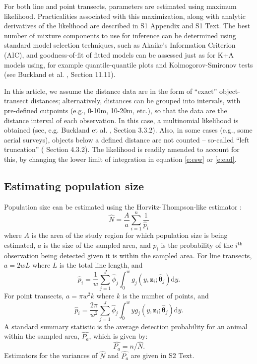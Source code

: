 \documentclass[10pt]{article}
\begin{document}
For both line and point transects, parameters are estimated using maximum likelihood. Practicalities associated with this maximization, along with analytic derivatives of the likelihood are described in S1 Appendix and S1 Text.  The best number of mixture components to use for inference can be determined using standard model selection techniques, such as Akaike's Information Criterion (AIC), and goodness-of-fit of fitted models can be assessed just as for K+A models using, for example quantile-quantile plots and Kolmogorov-Smironov tests (see Buckland et al. \cite{Buckland:2004ts}, Section 11.11).

In this article, we assume the distance data are in the form of ``exact'' object-transect distances; alternatively, distances can be grouped into intervals, with pre-defined cutpoints (e.g., 0-10m, 10-20m, etc.), so that the data are the distance interval of each observation.  In this case, a multinomial likelihood is obtained (see, e.g. Buckland et al. \cite{Buckland:2001vm}, Section 3.3.2).  Also, in some cases (e.g., some aerial surveys), objects below a defined distance are not counted -- so-called ``left truncation'' (\cite{Buckland:2001vm} Section 4.3.2).  The likelihood is readily amended to account for this, by changing the lower limit of integration in equation \eqref{e:esw} or \eqref{e:ead}.

\subsection*{Estimating population size}

Population size can be estimated using the Horvitz-Thompson-like estimator \cite{Marques:2003vb}:
\begin{equation}
\label{e:popsize}
\hat{N}=\frac{A}{a}\sum_{i=1}^n \frac{1}{\hat {p}_i}
\end{equation}
where $A$ is the area of the study region for which population size is being estimated, $a$ is the size of the sampled area, and $p_i$ is the probability of the $i^\text{th}$ observation being detected given it is within the sampled area.  For line transects, $a=2wL$ where $L$ is the total line length, and 
\begin{equation*}
\hat{p}_i = \frac{1}{w} \sum_{j=1}^J \hat{\phi}_j \int_0^w  g_j(y,\mathbf{z}_{i}; \boldsymbol{\hat{\theta}}_j) \text{d}y.
\end{equation*}
For point transects, $a=\pi w^2 k$ where $k$ is the number of points, and 
\begin{equation*}
\hat{p}_i = \frac{2\pi}{w^2} \sum_{j=1}^J \hat{\phi}_j \int_0^w  y g_j(y,\mathbf{z}_{i}; \boldsymbol{\hat{\theta}
}_j) \text{d}y.
\end{equation*}
A standard summary statistic is the average detection probability for an animal within the sampled area, $\hat{P_a}$, which is given by:
\begin{equation*}
\hat{P_a} = n/\hat{N}.
\end{equation*}
Estimators for the variances of $\hat{N}$ and $\hat{P_a}$ are given in S2 Text.
\end{document}
